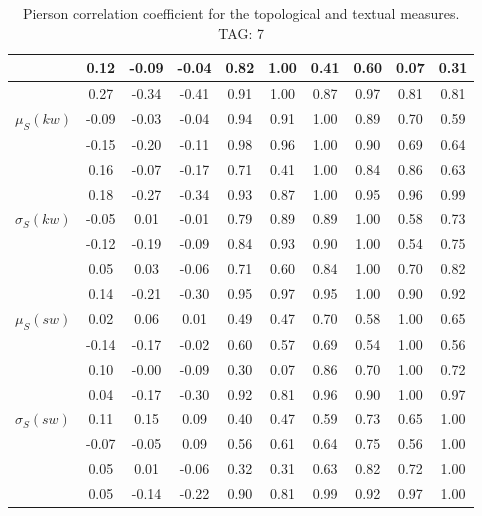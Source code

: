 \begin{table*}[h!]
\begin{center}
\begin{tabular}{| l | c | c | c | c | c | c | c | c | c |}
 & 0.12  & -0.09  & -0.04  & 0.82  & 1.00  & 0.41  & 0.60  & 0.07  & 0.31 \\\hline
 & 0.27  & -0.34  & -0.41  & 0.91  & 1.00  & 0.87  & 0.97  & 0.81  & 0.81 \\\hline
$\mu_S(kw)$ & -0.09  & -0.03  & -0.04  & 0.94  & 0.91  & 1.00  & 0.89  & 0.70  & 0.59 \\\hline
 & -0.15  & -0.20  & -0.11  & 0.98  & 0.96  & 1.00  & 0.90  & 0.69  & 0.64 \\\hline
 & 0.16  & -0.07  & -0.17  & 0.71  & 0.41  & 1.00  & 0.84  & 0.86  & 0.63 \\\hline
 & 0.18  & -0.27  & -0.34  & 0.93  & 0.87  & 1.00  & 0.95  & 0.96  & 0.99 \\\hline
$\sigma_S(kw)$ & -0.05  & 0.01  & -0.01  & 0.79  & 0.89  & 0.89  & 1.00  & 0.58  & 0.73 \\\hline
 & -0.12  & -0.19  & -0.09  & 0.84  & 0.93  & 0.90  & 1.00  & 0.54  & 0.75 \\\hline
 & 0.05  & 0.03  & -0.06  & 0.71  & 0.60  & 0.84  & 1.00  & 0.70  & 0.82 \\\hline
 & 0.14  & -0.21  & -0.30  & 0.95  & 0.97  & 0.95  & 1.00  & 0.90  & 0.92 \\\hline
$\mu_S(sw)$ & 0.02  & 0.06  & 0.01  & 0.49  & 0.47  & 0.70  & 0.58  & 1.00  & 0.65 \\\hline
 & -0.14  & -0.17  & -0.02  & 0.60  & 0.57  & 0.69  & 0.54  & 1.00  & 0.56 \\\hline
 & 0.10  & -0.00  & -0.09  & 0.30  & 0.07  & 0.86  & 0.70  & 1.00  & 0.72 \\\hline
 & 0.04  & -0.17  & -0.30  & 0.92  & 0.81  & 0.96  & 0.90  & 1.00  & 0.97 \\\hline
$\sigma_S(sw)$ & 0.11  & 0.15  & 0.09  & 0.40  & 0.47  & 0.59  & 0.73  & 0.65  & 1.00 \\\hline
 & -0.07  & -0.05  & 0.09  & 0.56  & 0.61  & 0.64  & 0.75  & 0.56  & 1.00 \\\hline
 & 0.05  & 0.01  & -0.06  & 0.32  & 0.31  & 0.63  & 0.82  & 0.72  & 1.00 \\\hline
 & 0.05  & -0.14  & -0.22  & 0.90  & 0.81  & 0.99  & 0.92  & 0.97  & 1.00 \\\hline
\end{tabular}
\caption{Pierson correlation coefficient for the topological and textual measures. TAG: 7}
\end{center}
\end{table*}